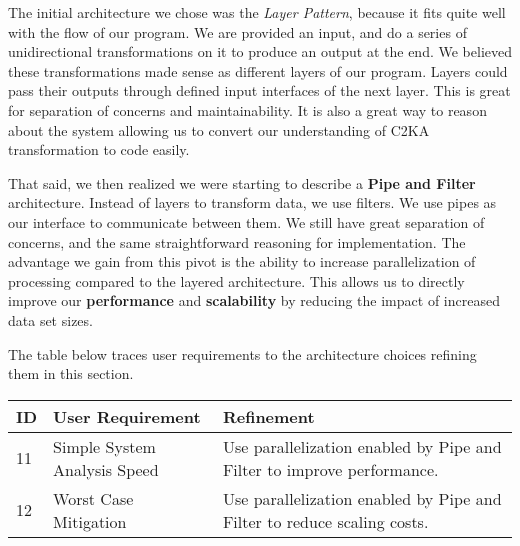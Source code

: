 \documentclass[11pt]{article}
\begin{document}
    The initial architecture we chose was the \textit{Layer Pattern}, because it fits quite well with the flow of our program.
    We are provided an input, and do a series of unidirectional transformations on it to produce an output at the end.
    We believed these transformations made sense as different layers of our program.
    Layers could pass their outputs through defined input interfaces of the next layer.
    This is great for separation of concerns and maintainability.
    It is also a great way to reason about the system allowing us to convert our understanding of C2KA transformation to code easily.

    That said, we then realized we were starting to describe a \textbf{Pipe and Filter} architecture.
    Instead of layers to transform data, we use filters.
    We use pipes as our interface to communicate between them.
    We still have great separation of concerns, and the same straightforward reasoning for implementation.
    The advantage we gain from this pivot is the ability to increase parallelization of processing compared to the layered architecture.
    This allows us to directly improve our \textbf{performance} and \textbf{scalability} by reducing the impact of increased data set sizes.

    The table below traces user requirements to the architecture choices refining them in this section.

    \begin{table}[htbp]
        \centering
        \begin{tabularx}{\textwidth}{| l | l | X |}
            \hline
            \textbf{ID} & \textbf{User Requirement} & \textbf{Refinement} \\
            \hline
            11 & Simple System Analysis Speed & Use parallelization enabled by Pipe and Filter to improve performance. \\ \hline
            12 & Worst Case Mitigation & Use parallelization enabled by Pipe and Filter to reduce scaling costs.  \\ \hline
        \end{tabularx}\label{tab:arch-choice-table}
    \end{table}

    \newpage
\end{document}
